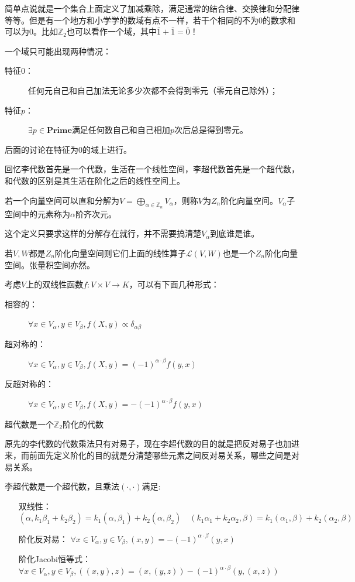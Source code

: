 简单点说就是一个集合上面定义了加减乘除，满足通常的结合律、交换律和分配律等等。但是有一个地方和小学学的数域有点不一样，若干个相同的不为0的数求和可以为0。比如$\mathbb{Z}_2$也可以看作一个域，其中$\bar 1+\bar 1=\bar 0$！
\begin{definition}
	一个域只可能出现两种情况：
	\begin{description}
		\item[特征$0$：] 任何元自己和自己加法无论多少次都不会得到零元（零元自己除外）；
		\item[特征$p$：] $\exists p\in\mathbf{Prime}$满足任何数自己和自己相加$p$次后总是得到零元。
 	\end{description}
\end{definition}
后面的讨论在特征为$0$的域上进行。

回忆李代数首先是一个代数，生活在一个线性空间，李超代数首先是一个超代数，和代数的区别是其生活在阶化之后的线性空间上。
\begin{definition}[$Z_n$阶化向量空间]
	若一个向量空间可以直和分解为$V=\bigoplus_{\alpha\in\mathbb{Z}_n}V_\alpha$，则称$V$为$Z_n$阶化向量空间。$V_\alpha$子空间中的元素称为$\alpha$阶齐次元。
\end{definition}
这个定义只要求这样的分解存在就行，并不需要搞清楚$V_\alpha$到底谁是谁。
\begin{theorem}
	若$V,W$都是$Z_n$阶化向量空间则它们上面的线性算子$\mathscr{L}(V,W)$也是一个$Z_n$阶化向量空间。张量积空间亦然。
\end{theorem}
考虑$V$上的双线性函数$f:V\times V\to K$，可以有下面几种形式：
\begin{description}
	\item[相容的：]$\forall x\in V_\alpha,y\in V_\beta,f(X,y)\propto\delta_{\alpha\beta}$
	\item[超对称的：]$\forall x\in V_\alpha,y\in V_\beta,f(X,y)=(-1)^{\alpha\cdot\beta}f(y,x)$
	\item[反超对称的：]$\forall x\in V_\alpha,y\in V_\beta,f(X,y)=-(-1)^{\alpha\cdot\beta}f(y,x)$
\end{description}
\begin{definition}
	超代数是一个$\mathbb{Z}_2$阶化的代数
\end{definition}
原先的李代数的代数乘法只有对易子，现在李超代数的目的就是把反对易子也加进来，而前面先定义阶化的目的就是分清楚哪些元素之间反对易关系，哪些之间是对易关系。
\begin{definition}
	李超代数是一个超代数，且乘法$(\cdot,\cdot)$满足:
	\begin{itemize}
		\item[双线性：] $(\alpha,k_1\beta_1+k_2\beta_2)=k_1(\alpha,\beta_1)+k_2(\alpha,\beta_2)\quad(k_1\alpha_1+k_2\alpha_2,\beta)=k_1(\alpha_1,\beta)+k_2(\alpha_2,\beta)$
		\item[阶化反对易：]$\forall x\in V_\alpha,y\in V_\beta,(x,y)=-(-1)^{\alpha\cdot\beta}(y,x)$
		\item[阶化Jacobi恒等式：]$\forall x\in V_\alpha,y\in V_\beta,\left((x,y),z\right)=\left(x,(y,z)\right)-(-1)^{\alpha\cdot\beta}\left(y,(x,z)\right)$
	\end{itemize}
\end{definition}

